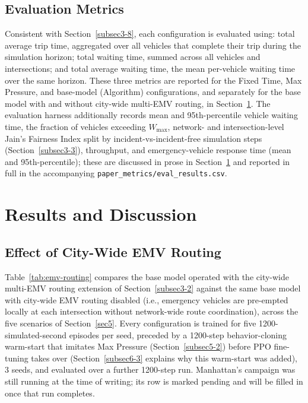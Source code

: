 \documentclass[3p,times]{elsarticle}
\theoremstyle{plain}
\theoremstyle{definition}
\begin{document}
\subsection{Evaluation Metrics}\label{subsec5-4}

Consistent with Section~\ref{subsec3-8}, each configuration is
evaluated using: total average trip time, aggregated over all vehicles
that complete their trip during the simulation horizon; total waiting
time, summed across all vehicles and intersections; and total average
waiting time, the mean per-vehicle waiting time over the same horizon.
These three metrics are reported for the Fixed Time, Max Pressure, and
base-model (Algorithm) configurations, and separately for the base
model with and without city-wide multi-EMV routing, in
Section~\ref{sec6}. The evaluation harness additionally records mean
and 95th-percentile vehicle waiting time, the fraction of vehicles
exceeding $W_{\max}$, network- and intersection-level Jain's Fairness
Index split by incident-vs-incident-free simulation steps
(Section~\ref{subsec3-3}), throughput, and emergency-vehicle response
time (mean and 95th-percentile); these are discussed in prose in
Section~\ref{sec6} and reported in full in the accompanying
\texttt{paper\_metrics/eval\_results.csv}.



\section{Results and Discussion}\label{sec6}

\subsection{Effect of City-Wide EMV Routing}\label{subsec6-1}

Table~\ref{tab:emv-routing} compares the base model operated with the
city-wide multi-EMV routing extension of Section~\ref{subsec3-2}
against the same base model with city-wide EMV routing disabled (i.e.,
emergency vehicles are pre-empted locally at each intersection without
network-wide route coordination), across the five scenarios of
Section~\ref{sec5}. Every configuration is trained for five
1200-simulated-second episodes per seed, preceded by a 1200-step
behavior-cloning warm-start that imitates Max Pressure
(Section~\ref{subsec5-2}) before PPO fine-tuning takes over
(Section~\ref{subsec6-3} explains why this warm-start was added), 3
seeds, and evaluated over a further 1200-step run. Manhattan's
campaign was still running at the time of writing; its row is marked
pending and will be filled in once that run completes.
\end{document}
